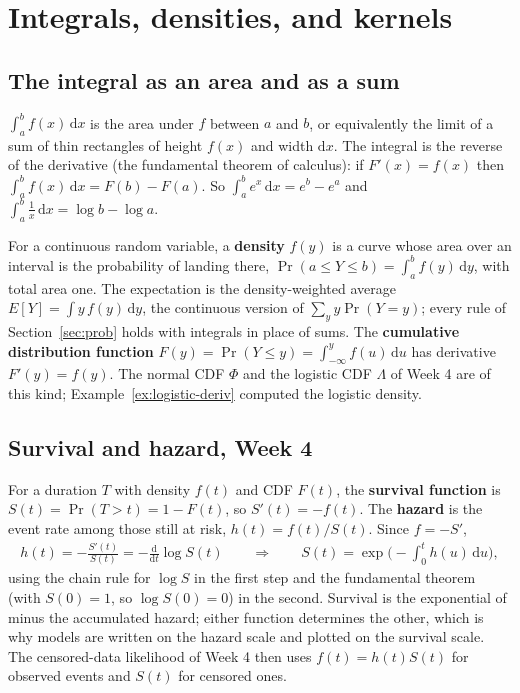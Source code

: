 \documentclass[11pt]{article}
\theoremstyle{definition}
\newcommand{\E}{E}
\newcommand{\dd}{\mathrm{d}}
\begin{document}
\section{Integrals, densities, and kernels}
\label{sec:integrals}

\subsection{The integral as an area and as a sum}

$\int_a^b f(x)\,\dd x$ is the area under $f$ between $a$ and $b$, or
equivalently the limit of a sum of thin rectangles of height $f(x)$ and
width $\dd x$. The integral is the reverse of the derivative (the
fundamental theorem of calculus): if $F'(x) = f(x)$ then $\int_a^b f(x)\,\dd
x = F(b) - F(a)$. So $\int_a^b e^{x}\,\dd x = e^{b} - e^{a}$ and $\int_a^b
\frac1x\,\dd x = \log b - \log a$.

For a continuous random variable, a \textbf{density} $f(y)$ is a curve
whose area over an interval is the probability of landing there,
$\Pr(a \le Y \le b) = \int_a^b f(y)\,\dd y$, with total area one. The
expectation is the density-weighted average $\E[Y] = \int y\,f(y)\,\dd y$,
the continuous version of $\sum_y y\Pr(Y = y)$; every rule of
Section~\ref{sec:prob} holds with integrals in place of sums. The
\textbf{cumulative distribution function} $F(y) = \Pr(Y \le y) =
\int_{-\infty}^{y} f(u)\,\dd u$ has derivative $F'(y) = f(y)$. The normal
CDF $\Phi$ and the logistic CDF $\Lambda$ of Week 4 are of this kind;
Example~\ref{ex:logistic-deriv} computed the logistic density.

\subsection{Survival and hazard, Week 4}

For a duration $T$ with density $f(t)$ and CDF $F(t)$, the
\textbf{survival function} is $S(t) = \Pr(T > t) = 1 - F(t)$, so
$S'(t) = -f(t)$. The \textbf{hazard} is the event rate among those still
at risk, $h(t) = f(t)/S(t)$. Since $f = -S'$,
\begin{align*}
  h(t) = -\frac{S'(t)}{S(t)} = -\frac{\dd}{\dd t}\log S(t)
  \qquad\Longrightarrow\qquad
  S(t) = \exp\!\Big(-\int_0^{t} h(u)\,\dd u\Big),
\end{align*}
using the chain rule for $\log S$ in the first step and the fundamental
theorem (with $S(0) = 1$, so $\log S(0) = 0$) in the second. Survival is the
exponential of minus the accumulated hazard; either function determines the
other, which is why models are written on the hazard scale and plotted on
the survival scale. The censored-data likelihood of Week 4 then uses $f(t)
= h(t)S(t)$ for observed events and $S(t)$ for censored ones.
\end{document}
